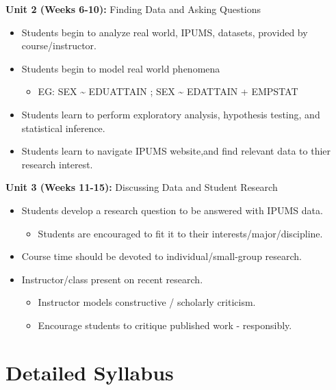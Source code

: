 \documentclass[
]{book}
\providecommand{\tightlist}{%
  \setlength{\itemsep}{0pt}\setlength{\parskip}{0pt}}
\begin{document}
\textbf{Unit 2 (Weeks 6-10):} Finding Data and Asking Questions

\begin{itemize}
\tightlist
\item
  Students begin to analyze real world, IPUMS, datasets, provided by course/instructor.
\item
  Students begin to model real world phenomena

  \begin{itemize}
  \tightlist
  \item
    EG: SEX \textasciitilde{} EDUATTAIN ; SEX \textasciitilde{} EDATTAIN + EMPSTAT
  \end{itemize}
\item
  Students learn to perform exploratory analysis, hypothesis testing, and statistical inference.
\item
  Students learn to navigate IPUMS website,and find relevant data to thier research interest.
\end{itemize}

\textbf{Unit 3 (Weeks 11-15):} Discussing Data and Student Research

\begin{itemize}
\tightlist
\item
  Students develop a research question to be answered with IPUMS data.

  \begin{itemize}
  \tightlist
  \item
    Students are encouraged to fit it to their interests/major/discipline.
  \end{itemize}
\item
  Course time should be devoted to individual/small-group research.
\item
  Instructor/class present on recent research.

  \begin{itemize}
  \tightlist
  \item
    Instructor models constructive / scholarly criticism.
  \item
    Encourage students to critique published work - responsibly.
  \end{itemize}
\end{itemize}

\hypertarget{detailed-syllabus}{%
\section*{Detailed Syllabus}\label{detailed-syllabus}}
\end{document}
